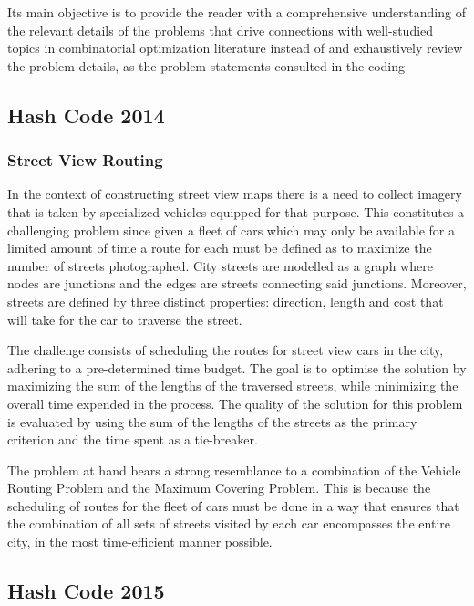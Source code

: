 Its main objective is to provide the reader with a comprehensive understanding
of the relevant details of the problems that drive connections with well-studied
topics in combinatorial optimization literature instead of and exhaustively
review the problem details, as the problem statements consulted  in the
coding~\cite{llc2023codingcompetitionsarchive}

\subsection{Hash Code 2014}
\label{subsec:hashcode-2014}

\subsubsection*{Street View Routing}
\label{subsubsec:hashcode-2014-final}

In the context of constructing street view maps there is a need to collect
imagery that is taken by specialized vehicles equipped for that purpose. This
constitutes a challenging problem since given a fleet of cars which may only be
available for a limited amount of time a route for each must be defined as to
maximize the number of streets photographed. City streets are modelled as a
graph where nodes are junctions and the edges are streets connecting said
junctions. Moreover, streets are defined by three distinct properties:
direction, length and cost that will take for the car to traverse the street.

The challenge consists of scheduling the routes for street view cars in the
city, adhering to a pre-determined time budget. The goal is to optimise the
solution by maximizing the sum of the lengths of the traversed streets, while
minimizing the overall time expended in the process. The quality of the solution
for this problem is evaluated by using the sum of the lengths of the streets as
the primary criterion and the time spent as a tie-breaker.

The problem at hand bears a strong resemblance to a combination of the Vehicle
Routing Problem and the Maximum Covering Problem. This is because the scheduling
of routes for the fleet of cars must be done in a way that ensures that the
combination of all sets of streets visited by each car encompasses the entire
city, in the most time-efficient manner possible.

\subsection{Hash Code 2015}
\label{subsec:hashcode-2015}

